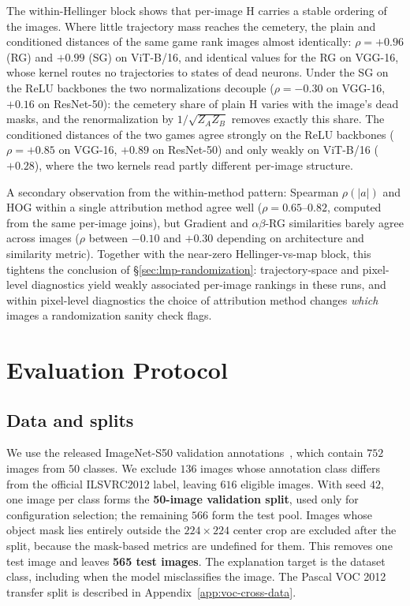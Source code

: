 \documentclass[twoside]{article}
\newcommand{\1}{\mathbf{1}}
\begin{document}
The within-Hellinger block shows that per-image $\mathrm{H}$ carries a stable ordering of the
images. Where little trajectory mass reaches the cemetery, the plain and conditioned distances of
the same game rank images almost identically: $\rho = +0.96$ (\ac{RG}) and $+0.99$ (\ac{SG}) on
ViT-B/16, and identical values for the \ac{RG} on VGG-16, whose kernel routes no trajectories to
states of dead neurons. Under the \ac{SG} on the \ac{ReLU} backbones the two normalizations
decouple ($\rho = -0.30$ on VGG-16, $+0.16$ on ResNet-50): the cemetery share of plain $\mathrm{H}$
varies with the image's dead masks, and the renormalization by $1/\sqrt{Z_A Z_B}$ removes exactly
this share. The conditioned distances of the two games agree strongly on the \ac{ReLU} backbones
($\rho = +0.85$ on VGG-16, $+0.89$ on ResNet-50) and only weakly on ViT-B/16 ($+0.28$), where the
two kernels read partly different per-image structure.

A secondary observation from the within-method pattern: Spearman $\rho(|a|)$ and HOG within a
single attribution method agree well ($\rho = 0.65$--$0.82$, computed from the same per-image
joins), but Gradient and $\alpha\beta$-\ac{RG} similarities barely agree across images ($\rho$
between $-0.10$ and $+0.30$ depending on architecture and similarity metric).  Together with the
near-zero Hellinger-vs-map block, this tightens the conclusion of \S\ref{sec:lmp-randomization}:
trajectory-space and pixel-level diagnostics yield weakly associated per-image rankings in these
runs, and within pixel-level diagnostics the choice of attribution method changes \emph{which} images a
randomization sanity check flags.
\newpage
\providecommand{\nValGrid}{\textcolor{red}{??}}%

\section{Evaluation Protocol}\label{app:protocol}

\subsection{Data and splits}

We use the released ImageNet-S50 validation annotations~\citep{gao2022luss}, which contain $752$
images from $50$ classes. We exclude $136$ images whose annotation class differs from the official
ILSVRC2012 label, leaving $616$ eligible images. With seed $42$, one image per class forms the
\textbf{50-image validation split}, used only for configuration selection; the remaining $566$
form the test pool. Images whose object mask lies entirely outside the $224{\times}224$ center crop
are excluded after the split, because the mask-based metrics are undefined for them. This removes
one test image and leaves \textbf{565 test images}. The explanation target is the dataset class,
including when the model misclassifies the image. The Pascal VOC 2012 transfer split is described
in Appendix~\ref{app:voc-cross-data}.
\end{document}
